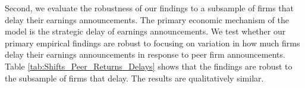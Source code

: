 \documentclass[authoryear,letterpaper,english,12pt]{elsarticle}
\begin{document}
Second, we evaluate the robustness of our findings to a subsample of firms that delay their earnings announcements. The primary economic mechanism of the model is the strategic delay of earnings announcements. We test whether our primary empirical findings are robust to focusing on variation in how much firms delay their earnings announcements in response to peer firm announcements. Table \ref{tab:Shifts_Peer_Returns_Delays} shows that the findings are robust to the subsample of firms that delay. The results are qualitatively similar. 


\newpage{}

{}



\newpage{}


\newpage{}

\end{document}

